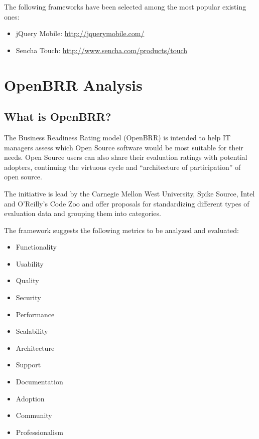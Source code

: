 \documentclass[a4paper,12pt]{book}
\begin{document}
The following frameworks have been selected among the most popular existing ones:

\begin{itemize}
 \item jQuery Mobile: \url{http://jquerymobile.com/}
 \item Sencha Touch: \url{http://www.sencha.com/products/touch}
\end{itemize}


\chapter{OpenBRR Analysis}
\label{chap:openbrr}

\section{What is OpenBRR?}
\label{sec:openbrr2}

The Business Readiness Rating model (OpenBRR)\cite{OpenBRRWhitepaper} is
intended to help IT managers assess which Open Source software would be most suitable for their needs. Open Source users can also share their evaluation ratings with potential adopters, continuing the virtuous cycle and “architecture of participation” of open
source.

The initiative is lead by the Carnegie Mellon West University, Spike Source,
Intel and O’Reilly’s Code Zoo and offer proposals for standardizing different
types of evaluation data and grouping them into categories.

The framework suggests the following metrics to be analyzed and evaluated:
\begin{itemize}
\item Functionality
\item Usability
\item Quality
\item Security
\item Performance
\item Scalability
\item Architecture
\item Support
\item Documentation
\item Adoption
\item Community
\item Professionalism
\end{itemize}
\end{document}
